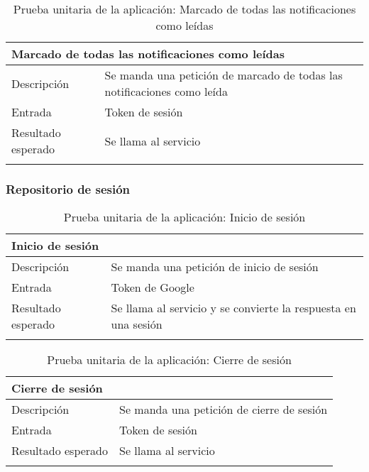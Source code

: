 \vspace{-15pt}
\begin{longtable}{|p{} p{}|}
    \hline
    \multicolumn{2}{|l|}{\textbf{Marcado de todas las notificaciones como leídas}} \\ \hline 
    Descripción                 & Se manda una petición de marcado de todas las notificaciones como leída \\ \hline
    Entrada                     & Token de sesión \\ \hline
    Resultado esperado          & Se llama al servicio  \\ \hline
    \caption{Prueba unitaria de la aplicación: Marcado de todas las notificaciones como leídas}
    \label{cp:u:app:marcado_todas_notificaciones_leidas_repo}
\end{longtable}

\subsubsection{Repositorio de sesión}

\begin{longtable}{|p{} p{}|}
    \hline
    \multicolumn{2}{|l|}{\textbf{Inicio de sesión}} \\ \hline 
    Descripción                 & Se manda una petición de inicio de sesión \\ \hline
    Entrada                     & Token de Google \\ \hline
    Resultado esperado          & Se llama al servicio  y se convierte la respuesta en una sesión \\ \hline
    \caption{Prueba unitaria de la aplicación: Inicio de sesión}
    \label{cp:u:app:inicio_sesion_repo}
\end{longtable}

\vspace{-15pt}
\begin{longtable}{|p{} p{}|}
    \hline
    \multicolumn{2}{|l|}{\textbf{Cierre de sesión}} \\ \hline 
    Descripción                 & Se manda una petición de cierre de sesión \\ \hline
    Entrada                     & Token de sesión \\ \hline
    Resultado esperado          & Se llama al servicio  \\ \hline
    \caption{Prueba unitaria de la aplicación: Cierre de sesión}
    \label{cp:u:app:cierre_sesion_repo}
\end{longtable}

